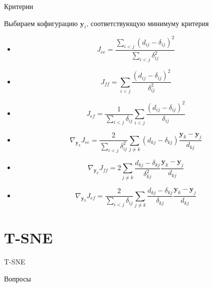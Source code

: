 \documentclass[10pt]{beamer}
\begin{document}
\begin{frame}{Критерии}

Выбираем кофигурацию $\mathbf{y}_i$, соответствующую минимуму критерия
\begin{itemize}
\item \[
J_{ee} = \frac{\sum_{i < j} (d_{ij} - \delta_{ij})^2} {\sum_{i < j} \delta_{ij}^2}
\]
\item \[
J_{ff} = \sum_{i < j} \frac{(d_{ij} - \delta_{ij})^2}{\delta_{ij}^2}
\]
\item \[
J_{ef} = \frac{1} {\sum_{i < j} \delta_{ij}}\sum_{i < j} \frac{(d_{ij} - \delta_{ij})^2}{\delta_{ij}}
\]
\end{itemize}

\end{frame}

\begin{frame}

\begin{itemize}
\item \[
\nabla_{\mathbf{y}_k}J_{ee} = \frac{2} {\sum_{i < j} \delta_{ij}^2} \sum_{j \neq k} (d_{kj} - \delta_{kj}) \frac{\mathbf{y}_k - \mathbf{y}_j}{d_{kj}}
\]
\item \[
\nabla_{\mathbf{y}_k} J_{ff} = 2 \sum_{j \neq k} \frac{d_{kj} - \delta_{kj}}{\delta_{kj}^2} \frac{\mathbf{y}_k - \mathbf{y}_j}{d_{kj}}
\]
\item \[
\nabla_{\mathbf{y}_k} J_{ef} = \frac{2} {\sum_{i < j} \delta_{ij}} \sum_{j \neq k} \frac{d_{kj} - \delta_{kj}}{\delta_{kj}} \frac{\mathbf{y}_k - \mathbf{y}_j}{d_{kj}}
\]
\end{itemize}

\end{frame}


\section{T-SNE}


\begin{frame}

\begin{center}
{\Large T-SNE}
\end{center}

\end{frame}

\begin{frame}[plain]
\begin{center}
{\Large Вопросы}
\end{center}
\end{frame}
\end{document}

